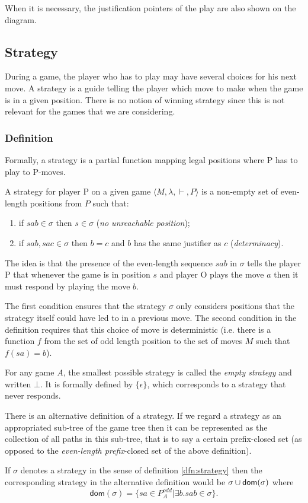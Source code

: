 When it is necessary, the justification pointers of the play are
also shown on the diagram.


\subsection{Strategy}

During a game, the player who has to play may have several choices
for his next move. A strategy is a guide telling the player which move to make when the
game is in a given position. There is no notion of winning strategy since this is
not relevant for the games that we are considering.

\subsubsection{Definition}
Formally, a strategy is a partial function mapping legal positions
where P has to play to P-moves.
\begin{dfn}[Strategy]
\label{dfn:strategy}
A strategy for player P on a given game $\langle M, \lambda, \vdash, P \rangle$ is a
non-empty set of even-length positions from $P$ such that:
\begin{enumerate}
\item if $sab \in \sigma$ then $s \in \sigma$ (\emph{no unreachable
position});
\item if $sab, sac \in \sigma$ then $b = c$  and $b$ has the same justifier as
$c$ (\emph{determinacy}).
\end{enumerate}
\end{dfn}

The idea is that the presence of the even-length sequence $s a b$ in
$\sigma$ tells the player P that whenever the game is in position
$s$ and player O plays the move $a$ then it must respond by playing
the move $b$.

The first condition ensures that the strategy $\sigma$ only
considers positions that the strategy itself could have led to in a
previous move. The second condition in the definition requires that
this choice of move is deterministic (i.e. there is a function $f$
from the set of odd length position to the set of moves $M$ such
that $f(s a) = b$).


For any game $A$, the smallest possible strategy is called the
\emph{empty strategy} and written $\bot$. It is formally defined by
$\{ \epsilon \}$, which corresponds to a strategy that never
responds.


\begin{rem}
\label{rem:atlern_strategy} There is an alternative definition of a
strategy. If we regard a strategy as an appropriated sub-tree of the
game tree then it can be represented as the collection of all paths
in this sub-tree, that is to say a certain prefix-closed set (as
opposed to the \emph{even-length prefix}-closed set of the above
definition).

If $\sigma$ denotes a strategy in the sense of definition \ref{dfn:strategy} then the corresponding strategy in the alternative definition would be
$\sigma \cup \textsf{dom}(\sigma)$ where
$$\textsf{dom}(\sigma) = \{ sa \in P_A^{odd} | \exists b . sab \in \sigma \}.$$
\end{rem}


